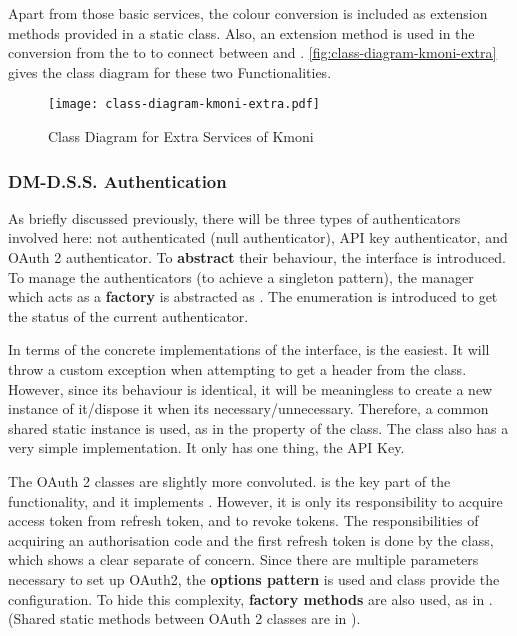 Apart from those basic services, the colour conversion is included as extension methods provided in a static class. Also, an extension method is used in the conversion from the  to  to connect between  and . \autoref{fig:class-diagram-kmoni-extra} gives the class diagram for these two Functionalities.

\begin{figure}[htp]
    \centering
    \texttt{[image: class-diagram-kmoni-extra.pdf]}
    \caption{Class Diagram for Extra Services of Kmoni}
    \label{fig:class-diagram-kmoni-extra}
\end{figure}

\subsubsection{DM-D.S.S. Authentication}

As briefly discussed previously, there will be three types of authenticators involved here: not authenticated (null authenticator), API key authenticator, and OAuth 2 authenticator. To \textbf{abstract} their behaviour, the interface  is introduced. To manage the authenticators (to achieve a singleton pattern), the manager which acts as a \textbf{factory} is abstracted as . The enumeration  is introduced to get the status of the current authenticator.

In terms of the concrete implementations of the interface,  is the easiest. It will throw a custom exception  when attempting to get a header from the class. However, since its behaviour is identical, it will be meaningless to create a new instance of it/dispose it when its necessary/unnecessary. Therefore, a common shared static instance is used, as in the  property of the class. The  class also has a very simple implementation. It only has one thing, the API Key.

The OAuth 2 classes are slightly more convoluted.  is the key part of the functionality, and it implements . However, it is only its responsibility to acquire access token from refresh token, and to revoke tokens. The responsibilities of acquiring an authorisation code and the first refresh token is done by the  class, which shows a clear separate of concern. Since there are multiple parameters necessary to set up OAuth2, the \textbf{options pattern} is used and  class provide the configuration. To hide this complexity, \textbf{factory methods} are also used, as in . (Shared static methods between OAuth 2 classes are in ).

